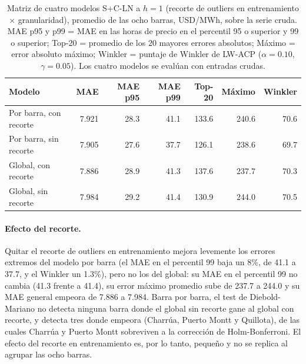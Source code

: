 \begin{table}[htbp]
    \centering
    \small
    \begin{tabular}{lrrrrrr}
        \toprule
        Modelo & MAE & MAE p95 & MAE p99 & Top-20 & Máximo & Winkler \\
        \midrule
        Por barra, con recorte & 7.921 & 28.3 & 41.1 & 133.6 & 240.6 & 70.6 \\
        Por barra, sin recorte & 7.905 & 27.6 & 37.7 & 126.1 & 238.6 & 69.7 \\
        Global, con recorte    & 7.886 & 28.9 & 41.3 & 137.6 & 237.7 & 70.3 \\
        Global, sin recorte    & 7.984 & 29.2 & 41.4 & 130.9 & 244.0 & 70.5 \\
        \bottomrule
    \end{tabular}
    \vspace{0.2cm}
    \caption{Matriz de cuatro modelos S+C-LN a $h=1$ (recorte de outliers en entrenamiento $\times$ granularidad), promedio de las ocho barras, USD/MWh, sobre la serie cruda. MAE p95 y p99 = MAE en las horas de precio en el percentil 95 o superior y 99 o superior; Top-20 = promedio de los 20 mayores errores absolutos; Máximo = error absoluto máximo; Winkler = puntaje de Winkler de LW-ACP ($\alpha=0.10$, $\gamma=0.05$). Los cuatro modelos se evalúan con entradas crudas.}
    \label{tab:matriz_outliers_granularidad}
\end{table}

\paragraph{Efecto del recorte.} Quitar el recorte de outliers en entrenamiento mejora levemente los errores extremos del modelo por barra (el MAE en el percentil 99 baja un 8\%, de 41.1 a 37.7, y el Winkler un 1.3\%), pero no los del global: su MAE en el percentil 99 no cambia (41.3 frente a 41.4), su error máximo promedio sube de 237.7 a 244.0 y su MAE general empeora de 7.886 a 7.984. Barra por barra, el test de Diebold-Mariano no detecta ninguna barra donde el global sin recorte gane al global con recorte, y detecta tres donde empeora (Charrúa, Puerto Montt y Quillota), de las cuales Charrúa y Puerto Montt sobreviven a la corrección de Holm-Bonferroni. El efecto del recorte en entrenamiento es, por lo tanto, pequeño y no se replica al agrupar las ocho barras.

